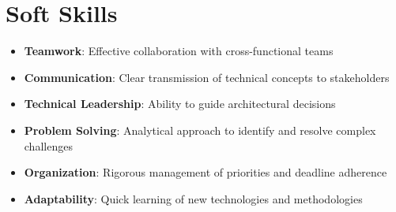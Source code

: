 
\section{Soft Skills}

\begin{itemize}
    \item \textbf{Teamwork}: Effective collaboration with cross-functional teams
    \item \textbf{Communication}: Clear transmission of technical concepts to stakeholders
    \item \textbf{Technical Leadership}: Ability to guide architectural decisions
    \item \textbf{Problem Solving}: Analytical approach to identify and resolve complex challenges
    \item \textbf{Organization}: Rigorous management of priorities and deadline adherence
    \item \textbf{Adaptability}: Quick learning of new technologies and methodologies
\end{itemize}
